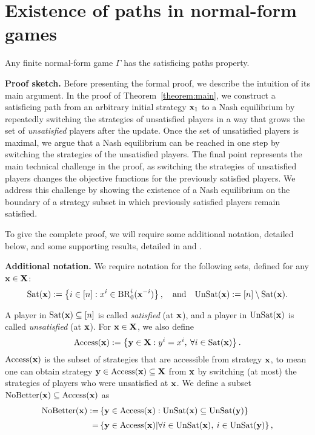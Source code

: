 \section{Existence of paths in normal-form games}  \label{sec:result}

\begin{theorem} \label{theorem:main}
    Any finite normal-form game $\Gamma$ has the satisficing paths property.
\end{theorem}


\noindent \textbf{Proof sketch.} Before presenting the formal proof, we describe the intuition of its main argument. In the proof of Theorem~\ref{theorem:main}, we construct a satisficing path from an arbitrary initial strategy ${\mathbf{x}}_1$ to a Nash equilibrium by repeatedly switching the strategies of unsatisfied players in a way that grows the set of \emph{unsatisfied} players after the update. Once the set of unsatisfied players is maximal, we argue that a Nash equilibrium can be reached in one step by switching the strategies of the unsatisfied players. The final point represents the main technical challenge in the proof, as switching the strategies of unsatisfied players changes the objective functions for the previously satisfied players. We address this challenge by showing the existence of a Nash equilibrium on the boundary of a strategy subset in which previously satisfied players remain satisfied.

\noindent To give the complete proof, we will require some additional notation, detailed below, and some supporting results, detailed in  and .


\noindent \textbf{Additional notation.}  We require notation for the following  sets, defined for any ${\mathbf{x}} \in {\mathbf{X}}$:
\begin{align*}
    {\rm Sat}({\mathbf{x}})      := \left\{ i \in [n] : x^i \in {\rm BR}^i_0 ( {\mathbf{x}}^{-i} )      \right\},  \quad \text{and} \quad     {\rm UnSat}({\mathbf{x}})    := [n] \setminus {\rm Sat}({\mathbf{x}}).                                                           
\end{align*}

A player in ${\rm Sat}({\mathbf{x}}) \subseteq [n]$ is called \emph{satisfied} (at ${\mathbf{x}}$), and a player in ${\rm UnSat}({\mathbf{x}})$ is called \emph{unsatisfied} (at ${\mathbf{x}}$). For ${\mathbf{x}} \in {\mathbf{X}}$, we also define
\[
 {\rm Access} ( {\mathbf{x}})    := \left\{ {\mathbf{y}} \in {\mathbf{X}} : y^i = x^i,  \: \forall i \in {\rm Sat}({\mathbf{x}})  \right\} .
\]
${\rm Access}( {\mathbf{x}} )$ is the subset of strategies that are accessible from strategy ${\mathbf{x}}$, to mean one can obtain strategy ${\mathbf{y}} \in {\rm Access}({\mathbf{x}}) \subseteq {\mathbf{X}} $ from ${\mathbf{x}}$ by switching (at most) the strategies of players who were unsatisfied at ${\mathbf{x}}$. We define a subset ${\rm NoBetter}({\mathbf{x}}) \subseteq {\rm Access}({\mathbf{x}})$ as 
\begin{align*}
{\rm NoBetter} ({\mathbf{x}})  :=&  \left\{ {\mathbf{y}} \in {\rm Access}({\mathbf{x}}) : {\rm UnSat}({\mathbf{x}}) \subseteq {\rm UnSat}({\mathbf{y}}) \right\} \\[2.5pt]
            =&   \left\{ {\mathbf{y}} \in {\rm Access}({\mathbf{x}}) \middle|  \forall i \in {\rm UnSat}({\mathbf{x}}), \: i \in {\rm UnSat}({\mathbf{y}})   \right\},
\end{align*}

